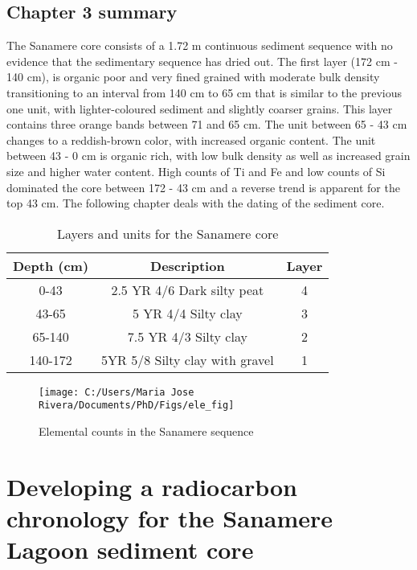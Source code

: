 \documentclass[
  12pt,
]{book}
\begin{document}
\hypertarget{chapter-3-summary}{%
\section{Chapter 3 summary}\label{chapter-3-summary}}

The Sanamere core consists of a 1.72 m continuous sediment sequence with no evidence that the sedimentary sequence has dried out. The first layer (172 cm - 140 cm), is organic poor and very fined grained with moderate bulk density transitioning to an interval from 140 cm to 65 cm that is similar to the previous one unit, with lighter-coloured sediment and slightly coarser grains. This layer contains three orange bands between 71 and 65 cm. The unit between 65 - 43 cm changes to a reddish-brown color, with increased organic content. The unit between 43 - 0 cm is organic rich, with low bulk density as well as increased grain size and higher water content. High counts of Ti and Fe and low counts of Si dominated the core between 172 - 43 cm and a reverse trend is apparent for the top 43 cm. The following chapter deals with the dating of the sediment core.

\begin{table}

\caption{\label{tab:tb-sed}Layers and units for the Sanamere core}
\centering
\begin{tabular}[t]{ccc}
\toprule
Depth (cm) & Description & Layer\\
\midrule
0-43 & 2.5 YR 4/6 Dark silty peat & 4\\
43-65 & 5 YR 4/4 Silty clay & 3\\
65-140 & 7.5 YR 4/3 Silty clay & 2\\
140-172 & 5YR 5/8 Silty clay with gravel & 1\\
\bottomrule
\end{tabular}
\end{table}



\begin{figure}

{\centering \texttt{[image: C:/Users/Maria Jose Rivera/Documents/PhD/Figs/ele\_fig]} 

}

\caption{Elemental counts in the Sanamere sequence}\label{fig:fig-ele}
\end{figure}



\hypertarget{ch:radiocarbon}{%
\chapter{Developing a radiocarbon chronology for the Sanamere Lagoon sediment core}\label{ch:radiocarbon}}
\end{document}
